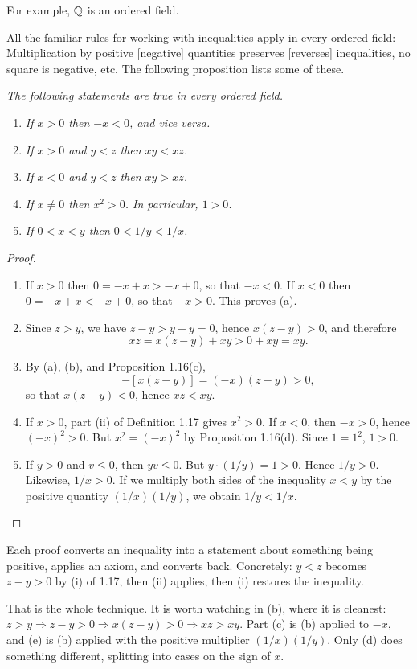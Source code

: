 For example, $\mathbb{Q}$ is an ordered field.

All the familiar rules for working with inequalities apply in every ordered
field: Multiplication by positive [negative] quantities preserves [reverses]
inequalities, no square is negative, etc. The following proposition lists some of
these.

\emph{The following statements are true in every ordered field.}
\begin{enumerate}[label=(\alph*), leftmargin=2.2em, itemsep=1pt, topsep=3pt]
  \item \emph{If $x > 0$ then $-x < 0$, and vice versa.}
  \item \emph{If $x > 0$ and $y < z$ then $xy < xz$.}
  \item \emph{If $x < 0$ and $y < z$ then $xy > xz$.}
  \item \emph{If $x \ne 0$ then $x^2 > 0$. In particular, $1 > 0$.}
  \item \emph{If $0 < x < y$ then $0 < 1/y < 1/x$.}
\end{enumerate}

\begin{proof}
\begin{enumerate}[label=(\alph*), leftmargin=2.2em, itemsep=4pt, topsep=3pt]
  \item If $x > 0$ then $0 = -x+x > -x+0$, so that $-x < 0$. If $x < 0$ then
        $0 = -x+x < -x+0$, so that $-x > 0$. This proves (a).
  \item Since $z > y$, we have $z - y > y - y = 0$, hence $x(z-y) > 0$, and
        therefore
        \[ xz = x(z-y)+xy > 0 + xy = xy. \]
  \item By (a), (b), and Proposition 1.16(c),
        \[ -[x(z-y)] = (-x)(z-y) > 0, \]
        so that $x(z-y) < 0$, hence $xz < xy$.
  \item If $x > 0$, part (ii) of Definition 1.17 gives $x^2 > 0$. If $x < 0$,
        then $-x > 0$, hence $(-x)^2 > 0$. But $x^2 = (-x)^2$ by Proposition
        1.16(d). Since $1 = 1^2$, $1 > 0$.
  \item If $y > 0$ and $v \le 0$, then $yv \le 0$. But $y \cdot (1/y) = 1 > 0$.
        Hence $1/y > 0$. Likewise, $1/x > 0$. If we multiply both sides of the
        inequality $x < y$ by the positive quantity $(1/x)(1/y)$, we obtain
        $1/y < 1/x$.
\end{enumerate}
\end{proof}

\begin{unpack}
Each proof converts an inequality into a statement about something being
positive, applies an axiom, and converts back. Concretely: $y < z$ becomes
$z - y > 0$ by (i) of 1.17, then (ii) applies, then (i) restores the inequality.

That is the whole technique. It is worth watching in (b), where it is cleanest:
$z>y \Rightarrow z-y>0 \Rightarrow x(z-y)>0 \Rightarrow xz > xy$. Part (c) is
(b) applied to $-x$, and (e) is (b) applied with the positive multiplier
$(1/x)(1/y)$. Only (d) does something different, splitting into cases on the
sign of $x$.
\end{unpack}

